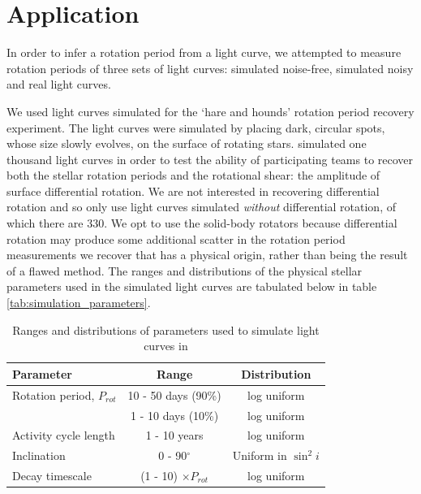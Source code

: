\section{Application}

In order to infer a rotation period from a light curve, we attempted to
measure rotation periods of three sets of light curves: simulated noise-free,
simulated noisy and real light curves.

We used light curves simulated for the \citet{aigrain15} `hare and hounds'
rotation period recovery experiment.
The light curves were simulated by placing dark, circular spots, whose size
slowly evolves, on the surface of rotating stars.
\citep{aigrain15} simulated one thousand light curves in order to test the
ability of participating teams to recover both the stellar rotation periods
and the rotational shear: the amplitude of surface differential rotation.
We are not interested in recovering differential rotation and so only use
light curves simulated {\it without} differential rotation, of which there are
330.
We opt to use the solid-body rotators because differential rotation may
produce some additional scatter in the rotation period measurements we recover
that has a physical origin, rather than being the result of a flawed method.
The ranges and distributions of the physical stellar parameters used in the
simulated light curves are tabulated below in table
\ref{tab:simulation_parameters}.

\begin{table}
\begin{center}
\caption{Ranges and distributions of parameters used to simulate light curves
in \citet{aigrain15}}
\begin{tabular}{lcc}
\hline\hline
    Parameter & Range & Distribution \\
    \hline
    Rotation period, $P_{rot}$ & 10 - 50 days (90\%) & log uniform \\
    & 1 - 10 days (10\%) & log uniform \\
    Activity cycle length & 1 - 10 years & log uniform \\
    Inclination & 0 - 90$^\circ$ & Uniform in $\sin^2i$ \\
    Decay timescale & (1 - 10) $\times P_{rot}$ & log uniform \\
\hline
\end{tabular}
\end{center}
\end{table}
\label{tab:simulation_parameters}

